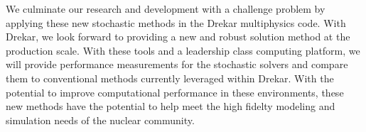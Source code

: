 We culminate our research and development with a challenge problem by
applying these new stochastic methods in the Drekar multiphysics
code. With Drekar, we look forward to providing a new and robust
solution method at the production scale. With these tools and a
leadership class computing platform, we will provide performance
measurements for the stochastic solvers and compare them to
conventional methods currently leveraged within Drekar. With the
potential to improve computational performance in these environments,
these new methods have the potential to help meet the high fidelty
modeling and simulation needs of the nuclear community.

